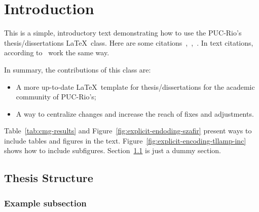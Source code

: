 \newpage

\chapter{Introduction}
\label{chap:introduction}

This is a simple, introductory text demonstrating how to use the PUC-Rio's thesis/dissertations \LaTeX~class. Here are some citations~\cite{Lee2010},~\cite{Hummel2013},~\cite{Dupacova2003}. In text citations, according to~\cite{Armstrong2013} work the same way.

In summary, the contributions of this class are:

\begin{itemize}
  \item A more up-to-date \LaTeX~template for thesis/dissertations for the academic community of PUC-Rio's;
  \item A way to centralize changes and increase the reach of fixes and adjustments.
\end{itemize}

Table~\ref{tab:cmg-results} and Figure~\ref{fig:explicit-endoding-szafir} present ways to include tables and figures in the text. Figure~\ref{fig:explicit-encoding-tllamp-inc} shows how to include subfigures. Section~\ref{sec:organization} is just a dummy section.

\section{Thesis Structure}
\label{sec:organization}

\subsection{Example subsection}

